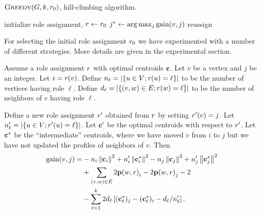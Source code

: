 \begin{algorithm}[t]
\caption{$\textsc{Greedy}(G, k, r_{0})$, hill-climbing algorithm.}
\label{alg:greedy}
initialize role assignment, $r \leftarrow r_{0}$\; 
 {
	 {
		$j^* \define \arg \max_j \gain{v, j}$\;
		 { reassign
		}
	}
}
\end{algorithm}

For selecting the initial role assignment ${r}_{0}$
we have experimented with a number of different strategies. 
More details are given in the experimental section.

\iffalse
As \alggreedy involves a number of nested loops, 
a na\"{i}ve implementation will make it prohibitively expensive for large networks.
However, we show that it is possible to implement \alggreedy 
in a much more efficient manner
so that the running time of the inner-most loop
({\bf foreach} loop in Algorithm~\ref{alg:greedy}) 
is linear in the size of the graph, 
and quadratic only in the number of roles $k$, 
which in practice can be assumed to be a very small constant.
\fi

\iffalse
\begin{proposition}
\label{prop:fastgain}
Assume a role assignment $r$ with optimal centroids $\mathbf{c}$. 
Let $v$ be a vertex and $j$ be an integer.
Let $i = r(v)$.
Define $n_\ell = {\left|\left\{u \in V ; r(u) = \ell\right\}\right|}$ to be the number of vertices having role $\ell$.
Define $d_\ell = {\left|\left\{(v, w) \in E ; r(w) = \ell\right\}\right|}$ to be the number of neighbors of $v$ having role $\ell$.

Define a new role assignment $r'$ obtained from $r$ by setting $r'(v) = j$.
Let $n'_\ell = {\left|\left\{u \in V ; r'(u) = \ell\right\}\right|}$.
Let $\mathbf{c}'$ be the optimal centroids with respect to $r'$. 
Let $\mathbf{c}^*$ be the ``intermediate'' centroids, where we have moved $v$ from $i$ to $j$ but we have not
updated the profiles of neighbors of $v$.  Then 
\[
\begin{split}
	\gain{v, j} = 
	& - n_i\norm{\centroid_i}^2 + n_i'\norm{\centroid_i^*}^2 - n_j\norm{\centroid_j}^2 + n_j'\norm{\centroid_j^*}^2 \\
	& + \sum_{(v, w) \in E} 2\prof{w, \role}_i - 2\prof{w, \role}_j  - 2  \\
	& - \sum_{\ell = 1}^k 2d_\ell \spr{(\centroid_\ell^*)_j  - (\centroid_\ell^*)_i - d_\ell / n_\ell' }.  \\
\end{split}
\]
\end{proposition}

